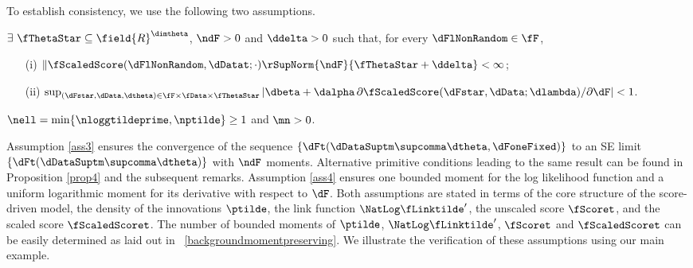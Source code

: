 To establish consistency, we use the following two assumptions. 

\begin{ass}
\label{ass3}
$\exists \ \fThetaStar \subseteq \field{R}^{\dimtheta} $, $\ndF >0$ and $\ddelta>0$ such that, for every %
$\dFlNonRandom \in \fF$,
\begin{enumerate}
    \item[(i)] $ \| \fScaledScore(\dFlNonRandom,\dDatat; \cdot) \rSupNorm{\ndF}{\fThetaStar+\ddelta}<\infty$;
    \item[(ii)] $\sup_{(\dFstar,\dData,\dtheta) \in \fF \times \fData \times \fThetaStar} 
    |\dbeta + \dalpha \, \partial \fScaledScore(\dFstar,\dData;\dlambda)/\partial\dF|
    <1$.
\end{enumerate}
\end{ass}

\begin{ass}
\label{ass4}
$\nell = \min \{ \nloggtildeprime, \nptilde\} \geq 1$ and $\mn>0$.
\end{ass}

Assumption \ref{ass3}  ensures the convergence of the  sequence $\{\dFt(\dDataSuptm\supcomma\dtheta,\dFoneFixed)\}$ to an SE limit $\{\dFt(\dDataSuptm\supcomma\dtheta)\}$ with $\ndF$ moments. Alternative primitive conditions leading to the same result can be found in Proposition \ref{prop4} and the subsequent remarks.  Assumption \ref{ass4} ensures one bounded moment for the log likelihood function and a uniform logarithmic moment for its derivative with respect to $\dF$. Both assumptions are stated in terms of the core structure of the score-driven model, the density of the innovations $\ptilde$, the link function $\NatLog\fLinktilde'$, the unscaled score $\fScoret$, and the scaled score $\fScaledScoret$. 
The number of bounded moments of $\ptilde$, $\NatLog\fLinktilde'$,  $\fScoret$ and $\fScaledScoret$ can be easily determined as laid out in \SupplementaryAppendix~\ref{backgroundmomentpreserving}.
We illustrate the verification of these assumptions using our main example.

